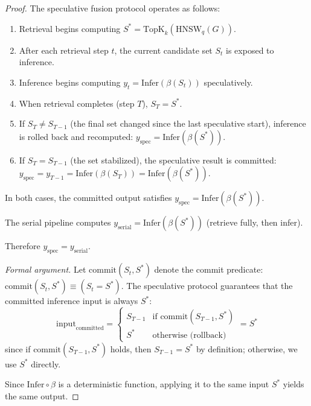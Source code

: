 \documentclass{article}
\theoremstyle{definition}
\theoremstyle{remark}
\begin{document}
\begin{proof}
The speculative fusion protocol operates as follows:
\begin{enumerate}[nosep]
  \item Retrieval begins computing $S^* = \mathrm{TopK}_k(\mathrm{HNSW}_q(G))$.
  \item After each retrieval step $t$, the current candidate set $S_t$ is exposed to inference.
  \item Inference begins computing $y_t = \mathrm{Infer}(\beta(S_t))$ speculatively.
  \item When retrieval completes (step $T$), $S_T = S^*$.
  \item If $S_T \neq S_{T-1}$ (the final set changed since the last speculative start), inference is rolled back and recomputed: $y_{\mathrm{spec}} = \mathrm{Infer}(\beta(S^*))$.
  \item If $S_T = S_{T-1}$ (the set stabilized), the speculative result is committed: $y_{\mathrm{spec}} = y_{T-1} = \mathrm{Infer}(\beta(S_T)) = \mathrm{Infer}(\beta(S^*))$.
\end{enumerate}

In both cases, the committed output satisfies $y_{\mathrm{spec}} = \mathrm{Infer}(\beta(S^*))$.

The serial pipeline computes $y_{\mathrm{serial}} = \mathrm{Infer}(\beta(S^*))$ (retrieve fully, then infer).

Therefore $y_{\mathrm{spec}} = y_{\mathrm{serial}}$.

\emph{Formal argument.}
Let $\mathrm{commit}(S_t, S^*)$ denote the commit predicate: $\mathrm{commit}(S_t, S^*) \equiv (S_t = S^*)$. The speculative protocol guarantees that the committed inference input is always $S^*$:
\[
  \mathrm{input}_{\mathrm{committed}} =
  \begin{cases}
    S_{T-1} & \text{if } \mathrm{commit}(S_{T-1}, S^*) \\
    S^* & \text{otherwise (rollback)}
  \end{cases}
  = S^*
\]
since if $\mathrm{commit}(S_{T-1}, S^*)$ holds, then $S_{T-1} = S^*$ by definition; otherwise, we use $S^*$ directly.

Since $\mathrm{Infer} \circ \beta$ is a deterministic function, applying it to the same input $S^*$ yields the same output.
\end{proof}

\end{document}
